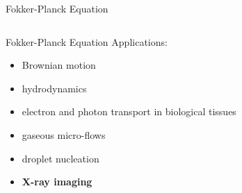 \documentclass[
 ]{beamer}%
\begin{document}
\begin{frame}{Fokker-Planck Equation}
\begin{columns}
\begin{column}{.25\textwidth}
        \end{column}
    \end{columns}
\end{frame}


\begin{frame}{Fokker-Planck Equation}
    Applications:
    \begin{itemize}
        \item Brownian motion           %
        \item hydrodynamics             %
        \item electron and photon transport in biological tissues
        \item gaseous micro-flows
        \item droplet nucleation        %
        \item \textbf{X-ray imaging}
    \end{itemize}
\end{frame}
\end{document}
